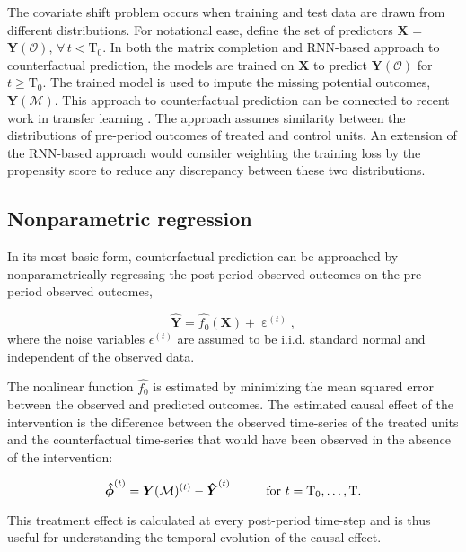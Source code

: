 \documentclass[hidelinks,12pt]{article}
\begin{document}
The covariate shift problem occurs when training and test data are drawn from different distributions. For notational ease, define the set of predictors $\boldsymbol{X}$ = $\boldsymbol{Y}(\mathcal{O}), \, \forall\, t < \text{T}_0$.  In both the matrix completion and RNN-based approach to counterfactual prediction, the models are trained on $\boldsymbol{X}$ to predict $\boldsymbol{Y}(\mathcal{O})$ for $t \geq \text{T}_0$. The trained model is used to impute the missing potential outcomes, $\boldsymbol{Y}(\mathcal{M})$. This approach to counterfactual prediction can be connected to recent work in transfer learning \citep{ben2007analysis,2015arXiv150507818G}. The approach assumes similarity between the distributions of pre-period outcomes of treated and control units. An extension of the RNN-based approach would consider weighting the training loss by the propensity score to reduce any discrepancy between these two distributions. 

\subsection{Nonparametric regression}

In its most basic form, counterfactual prediction can be approached by nonparametrically regressing the post-period observed outcomes on the pre-period observed outcomes,

\begin{equation}\label{eq:np}
  \boldsymbol{\hat{Y}} =  \hat{f_0} \left(\boldsymbol{X}\right) + \upepsilon^{(t)},
\end{equation}
\noindent
where the noise variables $\epsilon^{(t)}$ are assumed to be i.i.d. standard normal and independent of the observed data. 

The nonlinear function $\hat{f_0}$ is estimated by minimizing the mean squared error between the observed and predicted outcomes. The estimated causal effect of the intervention is the difference between the observed time-series of the treated units and the counterfactual time-series that would have been observed in the absence of the intervention:

\begin{equation}\label{eq:pointwise}
  \boldsymbol{\hat{\phi}}^{(t)} = \boldsymbol{Y}(\mathcal{M})^{(t)} - \boldsymbol{\hat{Y}}^{(t)} \hspace{10mm} \text{for } t = \text{T}_0, \ldots, \text{T}. 
\end{equation}

This treatment effect is calculated at every post-period time-step and is thus useful for understanding the temporal evolution of the causal effect.
\end{document}
